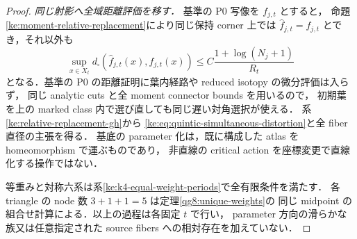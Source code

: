 \begin{proof}
\emph{同じ射影へ全域距離評価を移す．}
基準の P0 写像を $f_{j,t}$ とすると，
命題\ref{ke:moment-relative-replacement}により同じ保持 corner 上では
$\widehat f_{j,t}=f_{j,t}$ とでき，それ以外も
\[
 \sup_{x\in X_t}d_\square(\widehat f_{j,t}(x),f_{j,t}(x))
 \le C\frac{1+\log(N_j+1)}{R_t}
\]
となる．基準の P0 の距離証明に葉内経路や reduced isotopy の微分評価は入らず，
同じ analytic cuts と全 moment connector bounds を用いるので，
初期葉を上の marked class 内で選び直しても同じ遅い対角選択が使える．
系\ref{ke:relative-replacement-gh}から
\eqref{ke:eq:quintic-simultaneous-distortion}と全 fiber 直径の主張を得る．
基底の parameter 化は，既に構成した atlas を homeomorphism で運ぶものであり，
非直線の critical action を座標変更で直線化する操作ではない．

等重みと対称六系は系\ref{ke:k4-equal-weight-periods}で全有限条件を満たす．
各 triangle の node 数 $3+1+1=5$ は定理\ref{qg8:unique-weights}の
同じ midpoint の組合せ計算による．以上の過程は各固定 $t$ で行い，
parameter 方向の滑らかな族又は任意指定された source fibers への相対存在を加えていない．
\end{proof}
